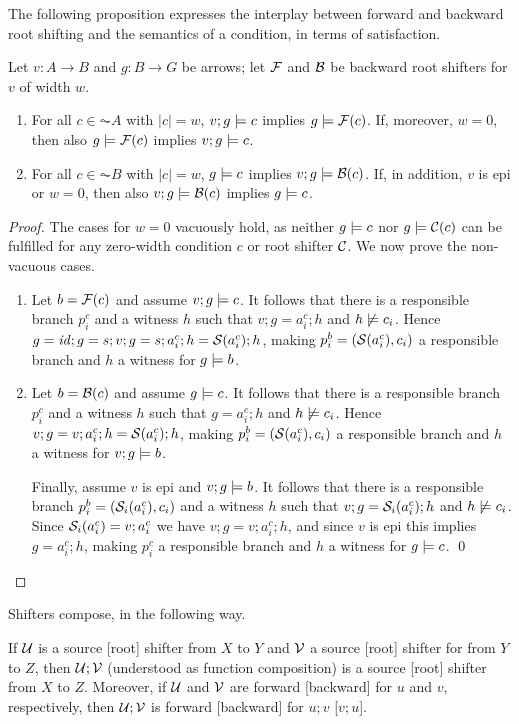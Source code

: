 The following proposition expresses the interplay between forward and backward root shifting and the semantics of a condition, in terms of satisfaction.
%
\begin{proposition}
Let $v:A\to B$ and $g:B\to G$ be arrows; let $\mathcal{F}$ and $\mathcal{B}$ be backward root shifters for $v$ of width $w$.
\begin{enumerate}
\item For all $c\in\AC A$ with $|c|=w$, $v;g\models c$ implies $g\models \mathcal{F}(c)$. If, moreover, $w=0$, then also $g\models \mathcal{F}(c)$ implies $v;g\models c$.
\item For all $c\in\AC B$ with $|c|=w$, $g\models c$ implies $v;g\models \mathcal{B}(c)$. If, in addition, $v$ is epi or $w=0$, then also $v;g\models \mathcal{B}(c)$ implies $g\models c$.
\end{enumerate}
\end{proposition}
%
\begin{proof}
The cases for $w=0$ vacuously hold, as neither $g\models c$ nor $g\models \mathcal{C}(c)$ can be fulfilled for any zero-width condition $c$ or root shifter $\mathcal{C}$. We now prove the non-vacuous cases.
\begin{enumerate}
\item Let $b=\mathcal{F}(c)$ and assume $v;g\models c$. It follows that there is a responsible branch $p^c_i$ and a witness $h$ such that $v;g=a^c_i;h$ and $h\not\models c_i$. Hence $g=\mathit{id};g=s;v;g=s;a^c_i;h=\mathcal{S}(a^c_i);h$, making $p^b_i=(\mathcal{S}(a^c_i),c_i)$ a responsible branch and $h$ a witness for $g\models b$.

\item Let $b=\mathcal{B}(c)$ and assume $g\models c$. It follows that there is a responsible branch $p^c_i$ and a witness $h$ such that $g=a^c_i;h$ and $h\not\models c_i$. Hence $v;g=v;a^c_i;h=\mathcal{S}(a^c_i);h$, making $p^b_i=(\mathcal{S}(a^c_i),c_i)$ a responsible branch and $h$ a witness for $v;g\models b$.

\smallskip
Finally, assume $v$ is epi and $v;g\models b$. It follows that there is a responsible branch $p^b_i=(\mathcal{S}_i(a^c_i),c_i)$ and a witness $h$ such that $v;g=\mathcal{S}_i(a^c_i);h$ and $h\not\models c_i$. Since $\mathcal{S}_i(a^c_i)=v;a^c_i$ we have $v;g=v;a^c_i;h$, and since $v$ is epi this implies $g=a^c_i;h$, making $p^c_i$ a responsible branch and $h$ a witness for $g\models c$.
\qed
\end{enumerate}
\end{proof}
%
Shifters compose, in the following way.
%
\begin{proposition}
If $\mathcal{U}$ is a source [root] shifter from $X$ to $Y$ and $\mathcal{V}$ a source [root] shifter for from $Y$ to $Z$, then $\mathcal{U};\mathcal{V}$ (understood as function composition) is a source [root] shifter from $X$ to $Z$. Moreover, if $\mathcal{U}$ and $\mathcal{V}$ are forward [backward] for $u$ and $v$, respectively, then $\mathcal{U};\mathcal{V}$ is forward [backward] for $u;v$ [$v;u$].
\end{proposition}

